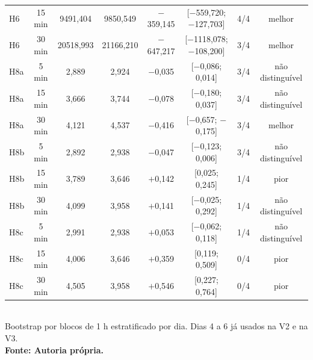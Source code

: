 \begin{table}[htb]
\begin{tabular}{|l|c|c|c|c|c|c|c|}
H6 & 15 min & 9491{,}404 & 9850{,}549 & $-$359{,}145 & [$-$559{,}720; $-$127{,}703] & 4/4 & melhor \\
H6 & 30 min & 20518{,}993 & 21166{,}210 & $-$647{,}217 & [$-$1118{,}078; $-$108{,}200] & 3/4 & melhor \\
H8a & 5 min & 2{,}889 & 2{,}924 & $-$0{,}035 & [$-$0{,}086; 0{,}014] & 3/4 & não distinguível \\
H8a & 15 min & 3{,}666 & 3{,}744 & $-$0{,}078 & [$-$0{,}180; 0{,}037] & 3/4 & não distinguível \\
H8a & 30 min & 4{,}121 & 4{,}537 & $-$0{,}416 & [$-$0{,}657; $-$0{,}175] & 3/4 & melhor \\
H8b & 5 min & 2{,}892 & 2{,}938 & $-$0{,}047 & [$-$0{,}123; 0{,}006] & 3/4 & não distinguível \\
H8b & 15 min & 3{,}789 & 3{,}646 & $+$0{,}142 & [0{,}025; 0{,}245] & 1/4 & pior \\
H8b & 30 min & 4{,}099 & 3{,}958 & $+$0{,}141 & [$-$0{,}025; 0{,}292] & 1/4 & não distinguível \\
H8c & 5 min & 2{,}991 & 2{,}938 & $+$0{,}053 & [$-$0{,}062; 0{,}118] & 1/4 & não distinguível \\
H8c & 15 min & 4{,}006 & 3{,}646 & $+$0{,}359 & [0{,}119; 0{,}509] & 0/4 & pior \\
H8c & 30 min & 4{,}505 & 3{,}958 & $+$0{,}546 & [0{,}227; 0{,}764] & 0/4 & pior \\
\hline
\end{tabular}\\
\footnotesize Bootstrap por blocos de 1 h estratificado por dia. Dias 4 a 6 já usados na V2 e na V3.\\
\textbf{\footnotesize Fonte: Autoria própria.}
\end{table}
